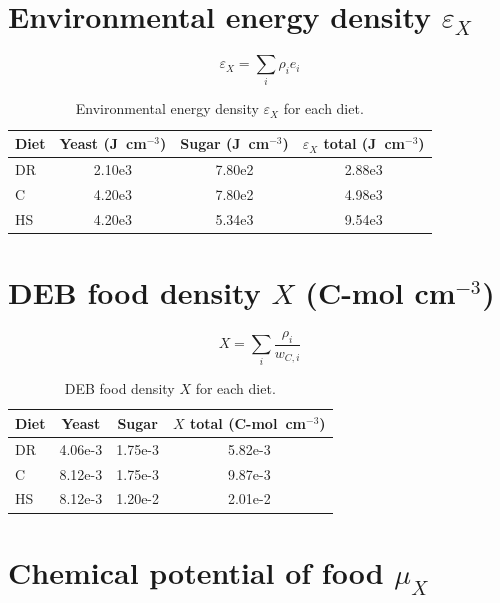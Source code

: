 \documentclass[11pt]{article}
\begin{document}
\section{Environmental energy density $\varepsilon_X$}

\[
  \varepsilon_X = \sum_i \rho_i e_i
\]

\begin{table}[h]
  \centering
  \begin{tabular}{lS[table-format=1.2e1]S[table-format=1.2e1]S[table-format=1.2e1]}
    \toprule
    Diet & {Yeast (J~cm$^{-3}$)} & {Sugar (J~cm$^{-3}$)} & {$\varepsilon_X$ total (J~cm$^{-3}$)} \\
    \midrule
    DR  & 2.10e3 & 7.80e2 & 2.88e3 \\
    C   & 4.20e3 & 7.80e2 & 4.98e3 \\
    HS  & 4.20e3 & 5.34e3 & 9.54e3 \\
    \bottomrule
  \end{tabular}
  \caption{Environmental energy density $\varepsilon_X$ for each diet.}
\end{table}

\section{DEB food density $X$ (C-mol cm$^{-3}$)}

\[
  X = \sum_i \frac{\rho_i}{w_{C,i}}
\]

\begin{table}[h]
  \centering
  \begin{tabular}{lS[table-format=1.2e-2]S[table-format=1.2e-2]S[table-format=1.2e-2]}
    \toprule
    Diet & {Yeast} & {Sugar} & {$X$ total (C-mol~cm$^{-3}$)} \\
    \midrule
    DR  & 4.06e-3 & 1.75e-3 & 5.82e-3 \\
    C   & 8.12e-3 & 1.75e-3 & 9.87e-3 \\
    HS  & 8.12e-3 & 1.20e-2 & 2.01e-2 \\
    \bottomrule
  \end{tabular}
  \caption{DEB food density $X$ for each diet.}
\end{table}

\section{Chemical potential of food $\mu_X$}
\end{document}

